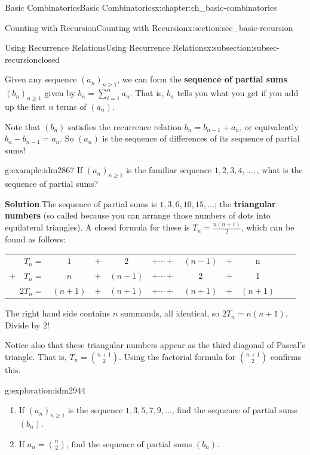 \documentclass[oneside,10pt,]{book}
\newcommand{\terminology}[1]{\textbf{#1}}
\numberwithin{equation}{chapter}
\newcommand{\hrulethin}  {\noalign{\hrule height 0.04em}}
\begin{document}
\begin{chapterptx}{Basic Combinatorics}{}{Basic Combinatorics}{}{}{x:chapter:ch_basic-combinatorics}
\begin{sectionptx}{Counting with Recursion}{}{Counting with Recursion}{}{}{x:section:sec_basic-recursion}
\begin{subsectionptx}{Using Recurrence Relations}{}{Using Recurrence Relations}{}{}{x:subsection:subsec-recursionclosed}
\par
Given any sequence \((a_n)_{n \ge 1}\), we can form the \terminology{sequence of partial sums} \((b_n)_{n \ge 1}\) given by \(b_n = \sum_{i = 1}^n a_n\).  That is, \(b_n\) tells you what you get if you add up the first \(n\) terms of \((a_n)\).%
\par
Note that \((b_n)\) satisfies the recurrence relation \(b_n = b_{n-1} + a_n\), or equivalently \(b_n - b_{n-1} = a_n\).  So \((a_n)\) is the sequence of differences of its sequence of partial sums!%
\begin{example}{}{g:example:idm2867}%
If \((a_n)_{n \ge 1}\) is the familiar sequence \(1, 2, 3, 4, \ldots,\), what is the sequence of partial sums?%
\par\smallskip%
\noindent\textbf{Solution}.\hypertarget{g:solution:idm2872}{}\quad{}The sequence of partial sums is \(1, 3, 6, 10, 15, \ldots\); the \terminology{triangular numbers} (so called because you can arrange those numbers of dots into equilateral triangles).  A closed formula for these is \(T_n = \frac{n(n+1)}{2}\), which can be found as follows:%
\begin{sidebyside}{1}{0}{0}{0}%
\begin{sbspanel}{1}%
{\centering%
\begin{tabular}{rccccccccc}
\(T_n  =\)&\(1\)&\(+\)&\(2\)&\(+ \cdots +\)&\((n-1)\)&\(+\)&n\tabularnewline[0pt]
\(+ \quad T_n  =\)&\(n\)&\(+\)&\((n-1)\)&\(+ \cdots +\)&\(2\)&\(+\)&1\tabularnewline\hrulethin
\(2T_n  =\)&\((n+1)\)&\(+\)&\((n+1)\)&\(+ \cdots +\)&\((n+1)\)&\(+\)&\((n+1)\)
\end{tabular}
\par}
\end{sbspanel}%
\end{sidebyside}%
\par
The right hand side contains \(n\) summands, all identical, so \(2T_n = n(n+1)\).  Divide by 2!%
\par
Notice also that these triangular numbers appear as the third diagonal of Pascal's triangle.  That is, \(T_n = \binom{n+1}{2}\).  Using the factorial formula for \(\binom{n+1}{2}\) confirms this.%
\end{example}
\begin{exploration}{}{g:exploration:idm2944}%
\begin{enumerate}[font=\bfseries,label=(\alph*),ref=\alph*]
\item{}If \((a_n)_{n \ge 1}\) is the sequence \(1, 3, 5, 7, 9, \ldots\), find the sequence of partial sums \((b_n)\).%
\item{}If \(a_n = \binom{n}{2}\), find the sequence of partial sums \((b_n)\).%

\end{enumerate}
\end{exploration}
\end{subsectionptx}
\end{sectionptx}
\end{chapterptx}
\end{document}
